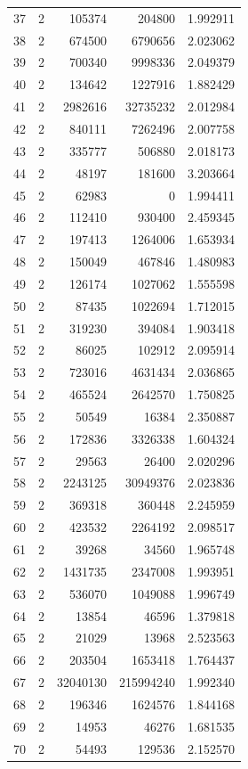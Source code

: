 \begin{longtable}{rrrrr}
37 & 2 & 105374 & 204800 & 1.992911\\
38 & 2 & 674500 & 6790656 & 2.023062\\
39 & 2 & 700340 & 9998336 & 2.049379\\
40 & 2 & 134642 & 1227916 & 1.882429\\
41 & 2 & 2982616 & 32735232 & 2.012984\\
42 & 2 & 840111 & 7262496 & 2.007758\\
43 & 2 & 335777 & 506880 & 2.018173\\
44 & 2 & 48197 & 181600 & 3.203664\\
45 & 2 & 62983 & 0 & 1.994411\\
46 & 2 & 112410 & 930400 & 2.459345\\
47 & 2 & 197413 & 1264006 & 1.653934\\
48 & 2 & 150049 & 467846 & 1.480983\\
49 & 2 & 126174 & 1027062 & 1.555598\\
50 & 2 & 87435 & 1022694 & 1.712015\\
51 & 2 & 319230 & 394084 & 1.903418\\
52 & 2 & 86025 & 102912 & 2.095914\\
53 & 2 & 723016 & 4631434 & 2.036865\\
54 & 2 & 465524 & 2642570 & 1.750825\\
55 & 2 & 50549 & 16384 & 2.350887\\
56 & 2 & 172836 & 3326338 & 1.604324\\
57 & 2 & 29563 & 26400 & 2.020296\\
58 & 2 & 2243125 & 30949376 & 2.023836\\
59 & 2 & 369318 & 360448 & 2.245959\\
60 & 2 & 423532 & 2264192 & 2.098517\\
61 & 2 & 39268 & 34560 & 1.965748\\
62 & 2 & 1431735 & 2347008 & 1.993951\\
63 & 2 & 536070 & 1049088 & 1.996749\\
64 & 2 & 13854 & 46596 & 1.379818\\
65 & 2 & 21029 & 13968 & 2.523563\\
66 & 2 & 203504 & 1653418 & 1.764437\\
67 & 2 & 32040130 & 215994240 & 1.992340\\
68 & 2 & 196346 & 1624576 & 1.844168\\
69 & 2 & 14953 & 46276 & 1.681535\\
70 & 2 & 54493 & 129536 & 2.152570\\

\end{longtable}
